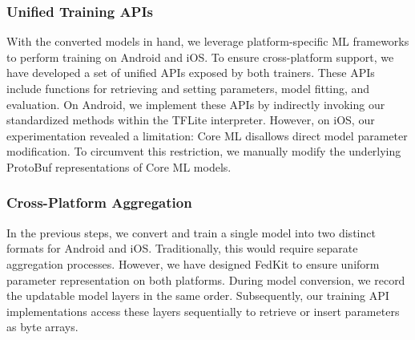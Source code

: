 \documentclass[letterpaper]{article} %
\begin{document}
\subsubsection{Unified Training APIs}
With the converted models in hand,
we leverage platform-specific ML frameworks to
perform training on Android and iOS.
To ensure cross-platform support,
we have developed a set of unified APIs exposed by both trainers.
These APIs include functions for retrieving and setting parameters,
model fitting, and evaluation.
On Android, we implement these APIs by indirectly invoking
our standardized methods within the TFLite interpreter.
However, on iOS, our experimentation revealed a limitation:
Core ML disallows direct model parameter modification.
To circumvent this restriction,
we manually modify the underlying ProtoBuf representations of Core ML models.

\subsubsection{Cross-Platform Aggregation}
In the previous steps,
we convert and train a single model into two distinct formats for
Android and iOS.
Traditionally, this would require separate aggregation processes.
However, we have designed FedKit to ensure uniform parameter representation
on both platforms.
During model conversion,
we record the updatable model layers in the same order.
Subsequently,
our training API implementations access these layers sequentially to
retrieve or insert parameters as byte arrays.
\end{document}
